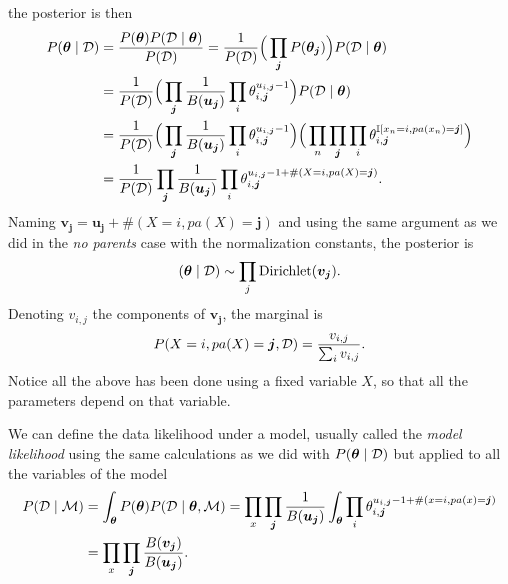 the posterior is then
\[
  \begin{aligned}
    P(\bm{\theta} \mid \mathcal{D}) &= \frac{P(\bm{\theta})P(\mathcal{D} \mid \bm{\theta}) }{P(\mathcal{D})} = \frac{1}{P(\mathcal{D})}\Big(\prod_{\bm{j}}P(\bm{\theta_{j}}) \Big)P(\mathcal{D} \mid \bm{\theta}) \\
    &= \frac{1}{P(\mathcal{D})}\Big(\prod_{\bm{j}}\frac{1}{B(\bm{u_{j}})}\prod_{i}\theta_{i,\bm{j}}^{u_{i,\bm{j}}-1}\Big) P(\mathcal{D} \mid \bm{\theta})\\
    &= \frac{1}{P(\mathcal{D})}\Big(\prod_{\bm{j}}\frac{1}{B(\bm{u_{j}})}\prod_{i}\theta_{i,\bm{j}}^{u_{i,\bm{j}}-1}\Big) \Big(\prod_{n}\prod_{\bm{j}}\prod_{i} \theta_{i,\bm{j}}^{\mathbb{I}[x_{n} = i, pa(x_{n}) = \bm{j}]}\Big)\\
    &= \frac{1}{P(\mathcal{D})}\prod_{\bm{j}}\frac{1}{B(\bm{u_{j}})}\prod_{i}\theta_{i,\bm{j}}^{u_{i,\bm{j}}-1 + \#(X = i,pa(X)=\bm{j})}.
  \end{aligned}
\]
Naming \(\bm{v_{j}} = \bm{u_{j}} + \#(X = i, pa(X) = \bm{j})\) and using the same argument as we did in the \emph{no parents} case with the normalization constants, the posterior is
\[
  (\bm{\theta} \mid \mathcal{D}) \sim \prod_{j}\text{Dirichlet}(\bm{v_{j}}).
\]
Denoting \(v_{i,j}\) the components of \(\bm{v_{j}}\), the marginal is
\[
  P(X=i, pa(X) = \bm{j}, \mathcal{D}) = \frac{v_{i,j}}{\sum_{i}v_{i,j}}.
\]
Notice all the above has been done using a fixed variable \(X\), so that all the parameters depend on that variable.

We can define the data likelihood under a model, usually called the \emph{model likelihood} using the same calculations as we did with \(P(\bm{\theta} \mid \mathcal{D})\) but applied to all the variables of the model
\[
  \begin{aligned}
    P(\mathcal{D} \mid \mathcal{M}) &= \int_{\bm{\theta}}P(\bm{\theta})P(\mathcal{D} \mid \bm{\theta}, \mathcal{M}) = \prod_{x} \prod_{\bm{j}} \frac{1}{B(\bm{u_{j}})} \int_{\bm{\theta}} \prod_{i}\theta_{i,\bm{j}}^{u_{i,\bm{j}}-1 + \#(x = i,pa(x)=\bm{j})}\\
    &= \prod_{x}\prod_{\bm{j}} \frac{B(\bm{v_{j}})}{B(\bm{u_{j}})}.
  \end{aligned}
\]
